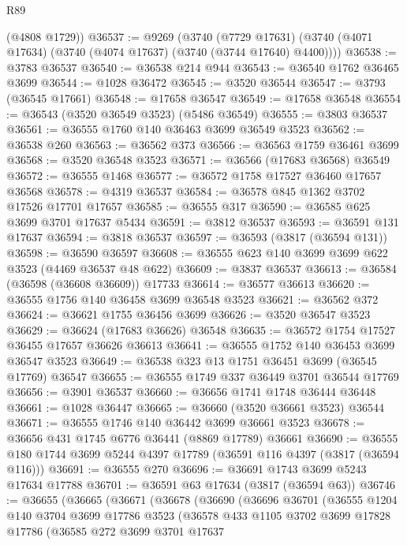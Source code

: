 \begin{lexlean}{R89}
\begin{coremodule}
      (@4808 @1729))
@36537 := @9269
    (@3740
      (@7729 @17631)
      (@3740 (@4071 @17634) (@3740 (@4074 @17637) (@3740 (@3744 @17640) @4400))))
@36538 := @3783 @36537
@36540 := @36538 @214 @944
@36543 := @36540 @1762 @36465 @3699
@36544 := @1028 @36472
@36545 := @3520 @36544
@36547 := @3793 (@36545 @17661)
@36548 := @17658 @36547
@36549 := @17658 @36548
@36554 := @36543 (@3520 @36549 @3523) (@5486 @36549)
@36555 := @3803 @36537
@36561 := @36555 @1760 @140 @36463 @3699 @36549 @3523
@36562 := @36538 @260
@36563 := @36562 @373
@36566 := @36563 @1759 @36461 @3699
@36568 := @3520 @36548 @3523
@36571 := @36566 (@17683 @36568) @36549
@36572 := @36555 @1468
@36577 := @36572 @1758 @17527 @36460 @17657 @36568
@36578 := @4319 @36537
@36584 := @36578 @845 @1362 @3702 @17526 @17701 @17657
@36585 := @36555 @317
@36590 := @36585 @625 @3699 @3701 @17637 @5434
@36591 := @3812 @36537
@36593 := @36591 @131 @17637
@36594 := @3818 @36537
@36597 := @36593 (@3817 (@36594 @131))
@36598 := @36590 @36597
@36608 := @36555 @623 @140 @3699 @3699 @622 @3523 (@4469 @36537 @48 @622)
@36609 := @3837 @36537
@36613 := @36584 (@36598 (@36608 @36609)) @17733
@36614 := @36577 @36613
@36620 := @36555 @1756 @140 @36458 @3699 @36548 @3523
@36621 := @36562 @372
@36624 := @36621 @1755 @36456 @3699
@36626 := @3520 @36547 @3523
@36629 := @36624 (@17683 @36626) @36548
@36635 := @36572 @1754 @17527 @36455 @17657 @36626 @36613
@36641 := @36555 @1752 @140 @36453 @3699 @36547 @3523
@36649 := @36538 @323 @13 @1751 @36451 @3699 (@36545 @17769) @36547
@36655 := @36555 @1749 @337 @36449 @3701 @36544 @17769
@36656 := @3901 @36537
@36660 := @36656 @1741 @1748 @36444 @36448
@36661 := @1028 @36447
@36665 := @36660 (@3520 @36661 @3523) @36544
@36671 := @36555 @1746 @140 @36442 @3699 @36661 @3523
@36678 := @36656 @431 @1745 @6776 @36441 (@8869 @17789) @36661
@36690 := @36555 @180 @1744 @3699 @5244 @4397 @17789 (@36591 @116 @4397 (@3817 (@36594 @116)))
@36691 := @36555 @270
@36696 := @36691 @1743 @3699 @5243 @17634 @17788
@36701 := @36591 @63 @17634 (@3817 (@36594 @63))
@36746 := @36655
    (@36665
      (@36671
        (@36678
          (@36690
            (@36696
              @36701
              (@36555
                @1204
                @140
                @3704
                @3699
                @17786
                @3523
                (@36578
                  @433
                  @1105
                  @3702
                  @3699
                  @17828
                  @17786
                  (@36585
                    @272
                    @3699
                    @3701
                    @17637

\end{coremodule}
\end{lexlean}
